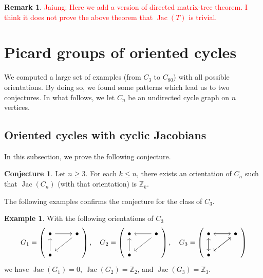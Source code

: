 \documentclass[11pt,reqno]{amsart}
\DeclareMathOperator{\Jac}{Jac}
\theoremstyle{definition}
\newtheorem{myeg}[mydef]{Example}
\newtheorem{conj}[mydef]{Conjecture}
\newtheorem{rmk}[mydef]{Remark}
\theoremstyle{plain}
\begin{document}
\begin{rmk}
\textcolor{red}{Jaiung: Here we add a version of directed matrix-tree theorem. I think it does not prove the above theorem that $\Jac(T)$ is trivial.}
\end{rmk}


\section{Picard groups of oriented cycles}

We computed a large set of examples (from $C_3$ to $C_{80}$) with all possible orientations. By doing so, we found some patterns which lead us to two conjectures. In what follows, we let $C_n$ be an undirected cycle graph on $n$ vertices.




\subsection{Oriented cycles with cyclic Jacobians} In this subsection, we prove the following conjecture. 
	
\begin{conj}\label{conjecture: single term}
Let $n \geq 3$. For each $k \leq n$, there exists an orientation of $C_n$ such that $\Jac(C_n)$ (with that orientation) is $\mathbb{Z}_k$.
\end{conj}

The following examples confirms the conjecture for the class of $C_3$. 

\begin{myeg}\label{example: example c3}
With the following orientations of $C_3$
\[
G_1=\left(\begin{tikzcd}
\bullet \arrow[r] & \bullet \arrow[dl] \\
\bullet \arrow[u]& 
\end{tikzcd} \right), \quad G_2=\left(\begin{tikzcd}
\bullet  & \bullet \arrow[l]\arrow[dl] \\
\bullet \arrow[u]& 
\end{tikzcd} \right), \quad G_3=\left(\begin{tikzcd}
\bullet \arrow[r] \arrow[d]& \bullet \arrow[dl] \arrow[l]\\
\bullet \arrow[u] \arrow[ur]& 
\end{tikzcd} \right)
\]
we have $\Jac(G_1)=0$, $\Jac(G_2)=\mathbb{Z}_2$, and $\Jac(G_3)=\mathbb{Z}_3$. 
\end{myeg}
\end{document}
